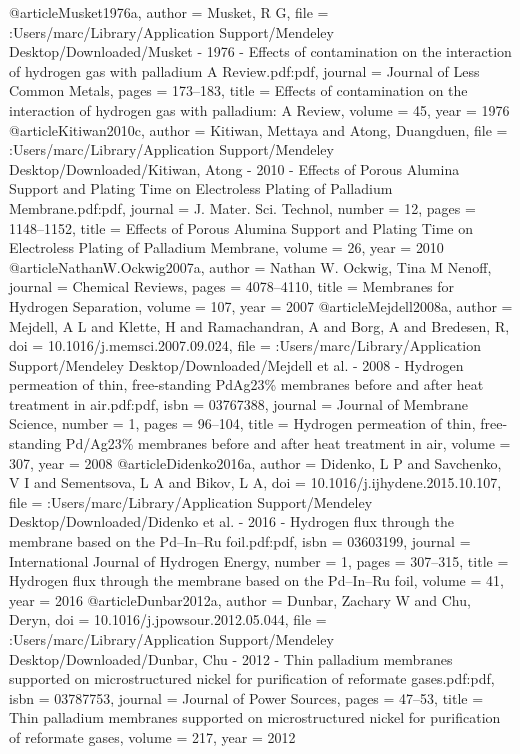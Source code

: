 @article{Musket1976a,
author = {Musket, R G},
file = {:Users/marc/Library/Application Support/Mendeley Desktop/Downloaded/Musket - 1976 - Effects of contamination on the interaction of hydrogen gas with palladium A Review.pdf:pdf},
journal = {Journal of Less Common Metals},
pages = {173--183},
title = {{Effects of contamination on the interaction of hydrogen gas with palladium: A Review}},
volume = {45},
year = {1976}
}
@article{Kitiwan2010c,
author = {Kitiwan, Mettaya and Atong, Duangduen},
file = {:Users/marc/Library/Application Support/Mendeley Desktop/Downloaded/Kitiwan, Atong - 2010 - Effects of Porous Alumina Support and Plating Time on Electroless Plating of Palladium Membrane.pdf:pdf},
journal = {J. Mater. Sci. Technol},
number = {12},
pages = {1148--1152},
title = {{Effects of Porous Alumina Support and Plating Time on Electroless Plating of Palladium Membrane}},
volume = {26},
year = {2010}
}
@article{NathanW.Ockwig2007a,
author = {{Nathan W. Ockwig}, Tina M Nenoff},
journal = {Chemical Reviews},
pages = {4078--4110},
title = {{Membranes for Hydrogen Separation}},
volume = {107},
year = {2007}
}
@article{Mejdell2008a,
author = {Mejdell, A L and Klette, H and Ramachandran, A and Borg, A and Bredesen, R},
doi = {10.1016/j.memsci.2007.09.024},
file = {:Users/marc/Library/Application Support/Mendeley Desktop/Downloaded/Mejdell et al. - 2008 - Hydrogen permeation of thin, free-standing PdAg23{\%} membranes before and after heat treatment in air.pdf:pdf},
isbn = {03767388},
journal = {Journal of Membrane Science},
number = {1},
pages = {96--104},
title = {{Hydrogen permeation of thin, free-standing Pd/Ag23{\%} membranes before and after heat treatment in air}},
volume = {307},
year = {2008}
}
@article{Didenko2016a,
author = {Didenko, L P and Savchenko, V I and Sementsova, L A and Bikov, L A},
doi = {10.1016/j.ijhydene.2015.10.107},
file = {:Users/marc/Library/Application Support/Mendeley Desktop/Downloaded/Didenko et al. - 2016 - Hydrogen flux through the membrane based on the Pd–In–Ru foil.pdf:pdf},
isbn = {03603199},
journal = {International Journal of Hydrogen Energy},
number = {1},
pages = {307--315},
title = {{Hydrogen flux through the membrane based on the Pd–In–Ru foil}},
volume = {41},
year = {2016}
}
@article{Dunbar2012a,
author = {Dunbar, Zachary W and Chu, Deryn},
doi = {10.1016/j.jpowsour.2012.05.044},
file = {:Users/marc/Library/Application Support/Mendeley Desktop/Downloaded/Dunbar, Chu - 2012 - Thin palladium membranes supported on microstructured nickel for purification of reformate gases.pdf:pdf},
isbn = {03787753},
journal = {Journal of Power Sources},
pages = {47--53},
title = {{Thin palladium membranes supported on microstructured nickel for purification of reformate gases}},
volume = {217},
year = {2012}
}
